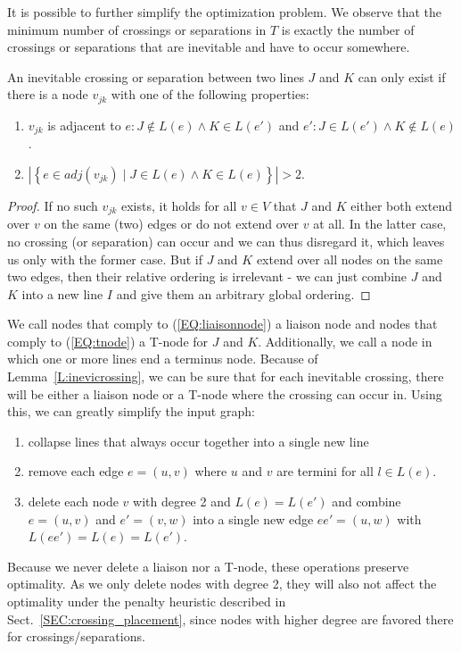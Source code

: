 \documentclass{llncs}
\begin{document}
It is possible to further simplify the optimization problem. We observe that the minimum number of crossings or separations in $T$ is exactly the number of crossings or separations that are inevitable and have to occur somewhere.
\begin{lemma}
An inevitable crossing or separation between two lines $J$ and $K$ can only exist if there is a node $v_{jk}$ with one of the following properties:
\begin{enumerate}
\item $v_{jk}$ is adjacent to $e : J \not\in L(e) \land K \in L(e')$ and $e' : J \in L(e') \land K \not\in L(e)$. \label{EQ:liaisonnode}
\item $\left|\left\{e \in adj\left(v_{jk}\right) \mid J \in L\left(e\right) \land K \in L\left(e\right)\right\}\right| > 2$. \label{EQ:tnode}
\end{enumerate}\label{L:inevicrossing}
\end{lemma}
\begin{proof} If no such $v_{jk}$ exists, it holds for all $v \in V$ that $J$ and $K$ either both extend over $v$ on the same (two) edges or do not extend over $v$ at all. In the latter case, no crossing (or separation) can occur and we can thus disregard it, which leaves us only with the former case. But if $J$ and $K$ extend over all nodes on the same two edges, then their relative ordering is irrelevant - we can just combine $J$ and $K$ into a new line $I$ and give them an arbitrary global ordering.
\end{proof}
We call nodes that comply to (\ref{EQ:liaisonnode}) a liaison node and nodes that comply to (\ref{EQ:tnode}) a T-node for $J$ and $K$. Additionally, we call a node in which one or more lines end a terminus node. Because of Lemma~\ref{L:inevicrossing}, we can be sure that for each inevitable crossing, there will be either a liaison node or a T-node where the crossing can occur in. Using this, we can greatly simplify the input graph:
\begin{enumerate}
	\item collapse lines that always occur together into a single new line
	\item remove each edge $e = (u, v)$ where $u$ and $v$ are termini for all $l \in L(e)$.
	\item delete each node $v$ with degree 2 and $L(e) = L(e')$ and combine $e = (u, v)$ and $e'=(v, w)$ into a single new edge $ee' = (u, w)$ with $L(ee') = L(e) = L(e')$.
\end{enumerate}
Because we never delete a liaison nor a T-node, these operations preserve optimality. As we only delete nodes with degree 2, they will also not affect the optimality under the penalty heuristic described in Sect.~\ref{SEC:crossing_placement}, since nodes with higher degree are favored there for crossings/separations.
\end{document}
